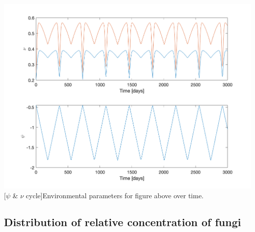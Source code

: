 \documentclass[12pt]{article}
\newenvironment{ColumnFigure}
{\par\medskip\noindent\minipage{\linewidth}}
{\endminipage\par\medskip}
\begin{document}
\begin{multicols}{2}
\begin{ColumnFigure}\label{Oscillating nu}
	\centering
	\includegraphics[width=\linewidth]{oscillating_psi_nu.png}
	[$\psi$ \& $\nu$ cycle]{Environmental parameters for figure above over time.}
\end{ColumnFigure}

\subsection{Distribution of relative concentration of fungi}


\end{multicols}
\end{document}
